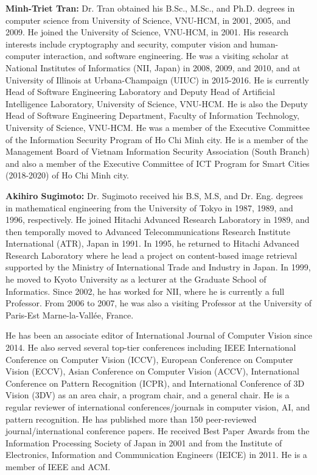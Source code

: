 \documentclass{ieeeaccess}
\begin{document}
\begin{IEEEbiography}{} \textbf{Minh-Triet Tran:} Dr. Tran obtained his B.Sc., M.Sc., and Ph.D. degrees in computer science from University of Science, VNU-HCM, in 2001, 2005, and 2009. He joined the University of Science, VNU-HCM, in 2001. His research interests include cryptography and security, computer vision and human-computer interaction, and software engineering. He was a visiting scholar at National Institutes of Informatics (NII, Japan) in 2008, 2009, and 2010, and at University of Illinois at Urbana-Champaign (UIUC) in 2015-2016.
He is currently Head of Software Engineering Laboratory and Deputy Head of Artificial Intelligence Laboratory, University of Science, VNU-HCM. He is also the Deputy Head of Software Engineering Department, Faculty of Information Technology, University of Science, VNU-HCM. He was a member of the Executive Committee of the Information Security Program of Ho Chi Minh city. He is a member of the Management Board of Vietnam Information Security Association (South Branch) and also a member of the Executive Committee of ICT Program for Smart Cities (2018-2020) of Ho Chi Minh city.
\end{IEEEbiography}

\begin{IEEEbiography}{} \textbf{Akihiro Sugimoto:} Dr. Sugimoto received his B.S, M.S, and Dr. Eng. degrees in mathematical engineering from the University of Tokyo in 1987, 1989, and 1996, respectively. He joined Hitachi Advanced Research Laboratory in 1989, and then temporally moved to Advanced Telecommunications Research Institute International (ATR), Japan in 1991. In 1995, he returned to Hitachi Advanced Research Laboratory where he lead a project on content-based image retrieval supported by the Ministry of International Trade and Industry in Japan. In 1999, he moved to Kyoto University as a lecturer at the Graduate School of Informatics. Since 2002, he has worked for NII, where he is currently a full Professor. From 2006 to 2007, he was also a visiting Professor at the University of Paris-Est Marne-la-Vallée, France. 

He has been an associate editor of International Journal of Computer Vision since 2014. He also served several top-tier conferences including IEEE International Conference on Computer Vision (ICCV), European Conference on Computer Vision (ECCV), Asian Conference on Computer Vision (ACCV), International Conference on Pattern Recognition (ICPR), and International Conference of 3D Vision (3DV) as an area chair, a program chair, and a general chair.  He is a regular reviewer of international conferences/journals in computer vision, AI, and pattern recognition. He has published more than 150 peer-reviewed journal/international conference papers.  He received Best Paper Awards from the Information Processing Society of Japan in 2001 and from the Institute of Electronics, Information and Communication Engineers (IEICE) in 2011. He is a member of IEEE and ACM.
\end{IEEEbiography}
\end{document}
